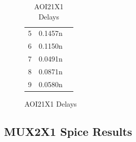 \begin{figure}[H]
\begin{minipage}[t]{.45\textwidth}
\begin{table}[H]
\begin{tabular}{crc}
                        5 & 0.1457n & \\
                        6 & 0.1150n & \\
                        7 & 0.0491n & \\
                        8 & 0.0871n & \\
                        9 & 0.0580n & \\
                        \bottomrule
                    \end{tabular}
                    \caption{AOI21X1 Delays}
                \end{table}
            \end{minipage}
        \end{figure}

        \newpage
        \subsection{MUX2X1 Spice Results}
        
